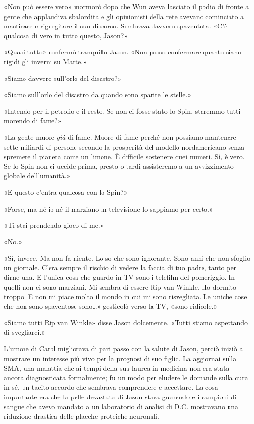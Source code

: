 «Non può essere vero» mormorò dopo che Wun aveva lasciato il podio di
fronte a gente che applaudiva sbalordita e gli opinionisti della rete
avevano cominciato a masticare e rigurgitare il suo discorso. Sembrava
davvero spaventata. «C'è qualcosa di vero in tutto questo, Jason?»

«Quasi tutto» confermò tranquillo Jason. «Non posso confermare quanto
siano rigidi gli inverni su Marte.»

«Siamo davvero sull'orlo del disastro?»

«Siamo sull'orlo del disastro da quando sono sparite le stelle.»

«Intendo per il petrolio e il resto. Se non ci fosse stato lo Spin,
staremmo tutti morendo di fame?»

«La gente muore \emph{già} di fame. Muore di fame perché non possiamo
mantenere sette miliardi di persone secondo la prosperità del modello
nordamericano senza spremere il pianeta come un limone. È difficile
sostenere quei numeri. Sì, è vero. Se lo Spin non ci uccide prima,
presto o tardi assisteremo a un avvizzimento globale dell'umanità.»

«E questo c'entra qualcosa con lo Spin?»

«Forse, ma né io né il marziano in televisione lo sappiamo per certo.»

«Ti stai prendendo gioco di me.»

«No.»

«Sì, invece. Ma non fa niente. Lo so che sono ignorante. Sono anni che
non sfoglio un giornale. C'era sempre il rischio di vedere la faccia di
tuo padre, tanto per dirne una. E l'unica cosa che guardo in TV sono i
telefilm del pomeriggio. In quelli non ci sono marziani. Mi sembra di
essere Rip van Winkle. Ho dormito troppo. E non mi piace molto il mondo
in cui mi sono risvegliata. Le uniche cose che non sono spaventose
sono\ldots» gesticolò verso la TV, «sono ridicole.»

«Siamo tutti Rip van Winkle» disse Jason dolcemente. «Tutti stiamo
aspettando di svegliarci.»

\separatorefiori

L'umore di Carol migliorava di pari passo con la salute di Jason, perciò
iniziò a mostrare un interesse più vivo per la prognosi di suo figlio.
La aggiornai sulla SMA, una malattia che ai tempi della sua laurea in
medicina non era stata ancora diagnosticata formalmente; fu un modo per
eludere le domande sulla cura in sé, un tacito accordo che sembrava
comprendere e accettare. La cosa importante era che la pelle devastata
di Jason stava guarendo e i campioni di sangue che avevo mandato a un
laboratorio di analisi di D.C. mostravano una riduzione drastica delle
placche proteiche neuronali.

